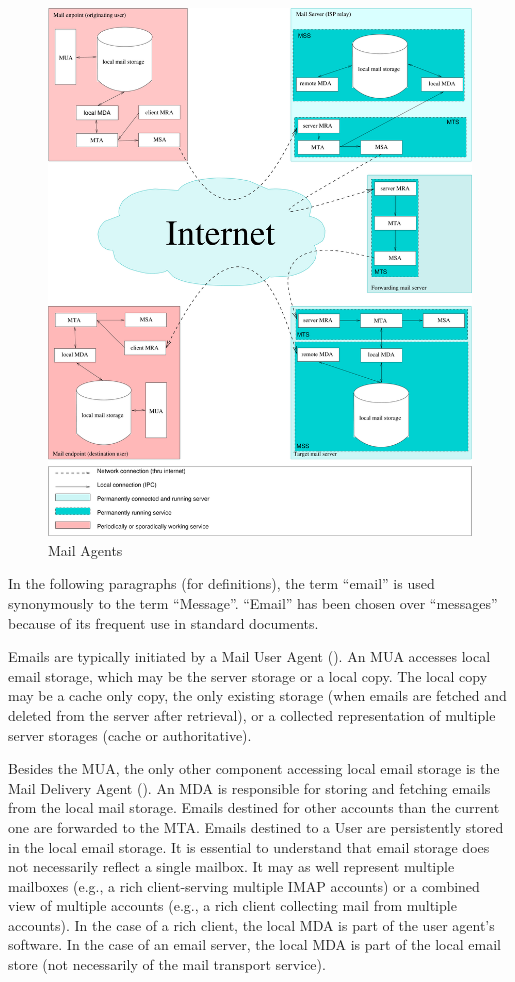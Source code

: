 \begin{figure}[ht!]
	\centering\includegraphics[width=\columnwidth]{inc/MailAgents1.pdf}
	\caption{Mail Agents}
	\label{fig:MailAgents}
\end{figure}

In the following paragraphs (for definitions), the term ``email'' is used synonymously to the term ``Message''.  ``Email'' has been chosen over ``messages'' because of its frequent use in standard documents.

Emails are typically initiated by a Mail User Agent (). An MUA accesses local email storage, which may be the server storage or a local copy. The local copy may be a cache only copy, the only existing storage (when emails are fetched and deleted from the server after retrieval), or a collected representation of multiple server storages (cache or authoritative).

Besides the MUA, the only other component accessing local email storage is the Mail Delivery Agent (). An MDA is responsible for storing and fetching emails from the local mail storage. Emails destined for other accounts than the current one are forwarded to the MTA. Emails destined to a User are persistently stored in the local email storage. It is essential to understand that email storage does not necessarily reflect a single mailbox. It may as well represent multiple mailboxes (e.g., a rich client-serving multiple IMAP accounts) or a combined view of multiple accounts (e.g., a rich client collecting mail from multiple  accounts). In the case of a rich client, the local MDA is part of the user agent's software. In the case of an email server, the local MDA is part of the local email store (not necessarily of the mail transport service).

